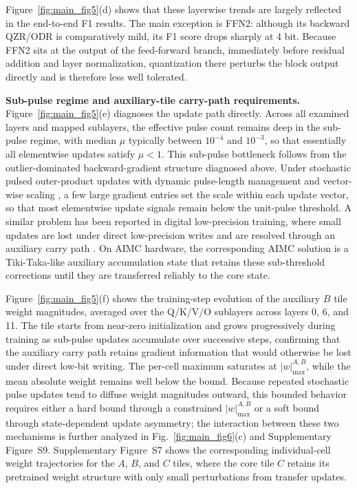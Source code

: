 \documentclass[AMA,LATO2COL]{WileyNJDv5}
\begin{document}
\noindent
Figure~\ref{fig:main_fig5}(d) shows that these layerwise trends are largely reflected in the end-to-end F1 results. The main exception is FFN2: although its backward QZR/ODR is comparatively mild, its F1 score drops sharply at 4 bit. Because FFN2 sits at the output of the feed-forward branch, immediately before residual addition and layer normalization, quantization there perturbs the block output directly and is therefore less well tolerated.

\noindent\textbf{Sub-pulse regime and auxiliary-tile carry-path requirements.}
Figure~\ref{fig:main_fig5}(e) diagnoses the update path directly. Across all examined layers and mapped sublayers, the effective pulse count remains deep in the sub-pulse regime, with median \(\mu\) typically between \(10^{-4}\) and \(10^{-3}\), so that essentially all elementwise updates satisfy \(\mu < 1\). This sub-pulse bottleneck follows from the outlier-dominated backward-gradient structure diagnosed above. Under stochastic pulsed outer-product updates with dynamic pulse-length management and vector-wise scaling \cite{rasch2021aihwkit,legallo2023aihwkit}, a few large gradient entries set the scale within each update vector, so that most elementwise update signals remain below the unit-pulse threshold. A similar problem has been reported in digital low-precision training, where small updates are lost under direct low-precision writes and are resolved through an auxiliary carry path \cite{nikdan2026eco}. On AIMC hardware, the corresponding AIMC solution is a Tiki-Taka-like auxiliary accumulation state that retains these sub-threshold corrections until they are transferred reliably to the core state. 

\noindent
Figure~\ref{fig:main_fig5}(f) shows the training-step evolution of the auxiliary \(B\) tile weight magnitudes, averaged over the Q/K/V/O sublayers across layers 0, 6, and 11. The tile starts from near-zero initialization and grows progressively during training as sub-pulse updates accumulate over successive steps, confirming that the auxiliary carry path retains gradient information that would otherwise be lost under direct low-bit writing. The per-cell maximum saturates at \(|w|_{\max}^{A,B}\), while the mean absolute weight remains well below the bound. Because repeated stochastic pulse updates tend to diffuse weight magnitudes outward, this bounded behavior requires either a hard bound through a constrained \(|w|_{\max}^{A,B}\) or a soft bound through state-dependent update asymmetry; the interaction between these two mechanisms is further analyzed in Fig.~\ref{fig:main_fig6}(c) and Supplementary Figure~S9. Supplementary Figure~S7 shows the corresponding individual-cell weight trajectories for the \(A\), \(B\), and \(C\) tiles, where the core tile \(C\) retains its pretrained weight structure with only small perturbations from transfer updates.
\end{document}
